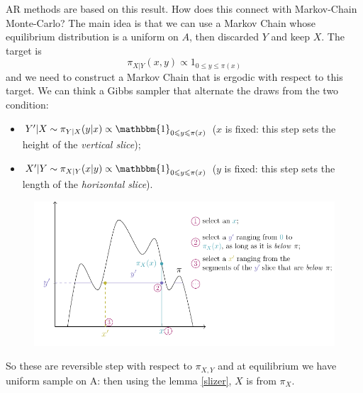 \documentclass{article}
\begin{document}
   AR methods are based on this result. 
     How does this connect with Markov-Chain Monte-Carlo? The main idea is that we can use  a Markov Chain whose equilibrium distribution is a uniform on $A$, then discarded $Y$ and keep $X$. The target is \[\pi_{X|Y}(x,y) \propto 1_{0 \leqslant y \leqslant \pi(x)} \] and we need to construct a Markov Chain that is ergodic with respect to this target.  We can think a Gibbs sampler that alternate the draws from the two condition:
    \begin{itemize}
        \item $Y'|X\sim \pi_{Y|X}(y|x)\propto\mathbbm{1}_{0\leqslant y\leqslant\pi(x)}$ ($x$ is fixed: this step sets the height of the \textit{vertical slice});
        \item $X'|Y\sim \pi_{X|Y}(x|y)\propto\mathbbm{1}_{0\leqslant y\leqslant\pi(x)}$ ($y$ is fixed: this step sets the length of the \textit{horizontal slice}).
    \end{itemize}
    \begin{figure}[H]
        \centering
        \includegraphics{standalones/pdfs/slicesampler}
        \label{slicesampler}
    \end{figure}
So these are reversible step with respect to $\pi_{X,Y}$ and at equilibrium we have uniform sample on A: then using the lemma \ref{slizer}, $X$ is from $\pi_X$.
\end{document}
